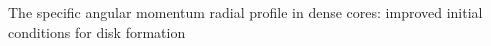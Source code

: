 The specific angular momentum radial profile in dense cores: improved initial conditions for disk formation